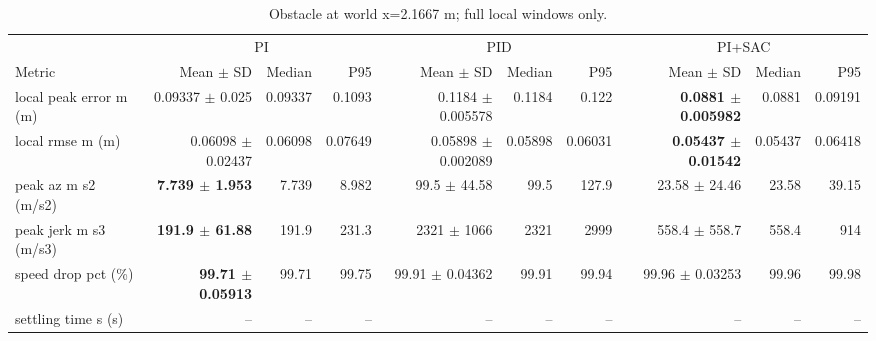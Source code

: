 \begin{table}[t]
\centering
\scriptsize
\caption{Obstacle at world x=2.1667 m; full local windows only.}
\label{tab:obstacle-4}
\begin{tabular}{p{}*{9}{r}}
\toprule
 & \multicolumn{3}{c}{PI} & \multicolumn{3}{c}{PID} & \multicolumn{3}{c}{PI+SAC} \\
\cmidrule(lr){2-4}\cmidrule(lr){5-7}\cmidrule(lr){8-10}
Metric & Mean $\pm$ SD & Median & P95 & Mean $\pm$ SD & Median & P95 & Mean $\pm$ SD & Median & P95 \\
\midrule
local peak error m (m) & 0.09337 $\pm$ 0.025 & 0.09337 & 0.1093 & 0.1184 $\pm$ 0.005578 & 0.1184 & 0.122 & \textbf{0.0881 $\pm$ 0.005982} & 0.0881 & 0.09191 \\
local rmse m (m) & 0.06098 $\pm$ 0.02437 & 0.06098 & 0.07649 & 0.05898 $\pm$ 0.002089 & 0.05898 & 0.06031 & \textbf{0.05437 $\pm$ 0.01542} & 0.05437 & 0.06418 \\
peak az m s2 (m/s2) & \textbf{7.739 $\pm$ 1.953} & 7.739 & 8.982 & 99.5 $\pm$ 44.58 & 99.5 & 127.9 & 23.58 $\pm$ 24.46 & 23.58 & 39.15 \\
peak jerk m s3 (m/s3) & \textbf{191.9 $\pm$ 61.88} & 191.9 & 231.3 & 2321 $\pm$ 1066 & 2321 & 2999 & 558.4 $\pm$ 558.7 & 558.4 & 914 \\
speed drop pct (\%) & \textbf{99.71 $\pm$ 0.05913} & 99.71 & 99.75 & 99.91 $\pm$ 0.04362 & 99.91 & 99.94 & 99.96 $\pm$ 0.03253 & 99.96 & 99.98 \\
settling time s (s) & -- & -- & -- & -- & -- & -- & -- & -- & -- \\
\bottomrule
\end{tabular}
\end{table}
